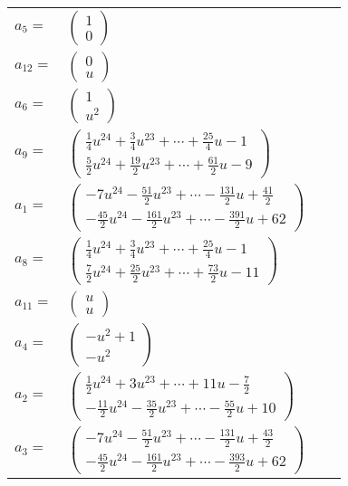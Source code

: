 \documentclass[1p]{elsarticle_modified}
\theoremstyle{definition}
\begin{document}
\begin{tabular}{m{7pt} m{180pt} m{7pt} m{180pt} }
\flushright $a_{5}=$&$\begin{pmatrix}1\\0\end{pmatrix}$ \\
\flushright $a_{12}=$&$\begin{pmatrix}0\\u\end{pmatrix}$ \\
\flushright $a_{6}=$&$\begin{pmatrix}1\\u^2\end{pmatrix}$ \\
\flushright $a_{9}=$&$\begin{pmatrix}\frac{1}{4} u^{24}+\frac{3}{4} u^{23}+\cdots+\frac{25}{4} u-1\\\frac{5}{2} u^{24}+\frac{19}{2} u^{23}+\cdots+\frac{61}{2} u-9\end{pmatrix}$ \\
\flushright $a_{1}=$&$\begin{pmatrix}-7 u^{24}-\frac{51}{2} u^{23}+\cdots-\frac{131}{2} u+\frac{41}{2}\\-\frac{45}{2} u^{24}-\frac{161}{2} u^{23}+\cdots-\frac{391}{2} u+62\end{pmatrix}$ \\
\flushright $a_{8}=$&$\begin{pmatrix}\frac{1}{4} u^{24}+\frac{3}{4} u^{23}+\cdots+\frac{25}{4} u-1\\\frac{7}{2} u^{24}+\frac{25}{2} u^{23}+\cdots+\frac{73}{2} u-11\end{pmatrix}$ \\
\flushright $a_{11}=$&$\begin{pmatrix}u\\u\end{pmatrix}$ \\
\flushright $a_{4}=$&$\begin{pmatrix}- u^2+1\\- u^2\end{pmatrix}$ \\
\flushright $a_{2}=$&$\begin{pmatrix}\frac{1}{2} u^{24}+3 u^{23}+\cdots+11 u-\frac{7}{2}\\-\frac{11}{2} u^{24}-\frac{35}{2} u^{23}+\cdots-\frac{55}{2} u+10\end{pmatrix}$ \\
\flushright $a_{3}=$&$\begin{pmatrix}-7 u^{24}-\frac{51}{2} u^{23}+\cdots-\frac{131}{2} u+\frac{43}{2}\\-\frac{45}{2} u^{24}-\frac{161}{2} u^{23}+\cdots-\frac{393}{2} u+62\end{pmatrix}$ \\

\end{tabular}
\end{document}
